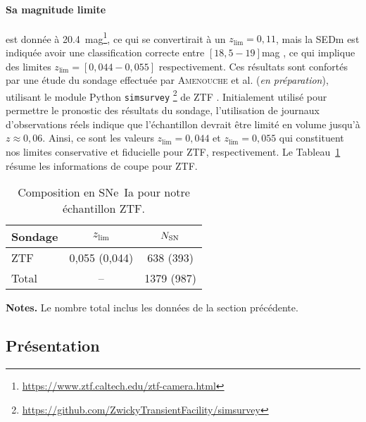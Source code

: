 \documentclass[../main/main.tex]{subfiles}
\begin{document}
\paragraph*{Sa magnitude limite} est donnée à
\SI{20.4}{mag}\footnote{\href{https://www.ztf.caltech.edu/ztf-camera.html}
{https://www.ztf.caltech.edu/ztf-camera.html}}, ce qui se convertirait à un
$z_{\lim} = 0,11$, mais la SEDm est indiquée avoir une classification correcte
entre $[18,5-19]$\si{mag} \citep{fremling2020}, ce qui implique des limites
$z_{\lim} = [0,044-0,055]$ respectivement. Ces résultats sont confortés par une
étude du sondage effectuée par \textsc{Amenouche} et al. (\textit{en
préparation}), utilisant le module Python
\texttt{simsurvey}
\footnote{\href{https://github.com/ZwickyTransientFacility/simsurvey}
{https://github.com/ZwickyTransientFacility/simsurvey}} de ZTF
\citep{feindt2019}. Initialement utilisé pour permettre le pronostic des
résultats du sondage, l'utilisation de journaux d'observations réels indique que
l'échantillon devrait être limité en volume jusqu'à $z \approx 0,06$. Ainsi, ce
sont les valeurs $z_{\lim} = 0,044$ et $z_{\lim} = 0,055$ qui constituent nos
limites conservative et fiducielle pour ZTF, respectivement. Le
Tableau~\ref{tab:zlimztf} résume les informations de coupe pour ZTF.

\begin{table}[ht]
    \centering
    \begin{threeparttable}
        \caption{Composition en SNe~Ia pour notre échantillon ZTF.}
        \label{tab:zlimztf}
        \begin{tabular}{lcc}
            \toprule
            Sondage & $z_{\lim}$ & $N_{\rm SN}$\\
            \midrule
            ZTF & 0,055 (0,044) & 638 (393) \\
            \midrule
            Total & -- & 1379 (987)\\
            \bottomrule
        \end{tabular}
        \begin{tablenotes}[flushleft]
            \item \textbf{\hspace{-3,2pt}Notes.} Le nombre total inclus les
                données de la section précédente.
        \end{tablenotes}
    \end{threeparttable}
\end{table}

\subsection{Présentation}\label{ssec:ztfpres}
\end{document}
